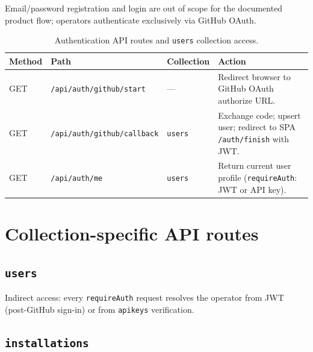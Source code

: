 Email/password registration and login are out of scope for the documented product flow; operators authenticate exclusively via GitHub OAuth.

\begin{table}[htbp]
  \centering
  \caption{Authentication API routes and \texttt{users} collection access.}
  \label{tab:auth-routes}
  \begin{tabular}{@{}lllp{}@{}}
    \toprule
    \textbf{Method} & \textbf{Path} & \textbf{Collection} & \textbf{Action} \\
    \midrule
    GET  & \texttt{/api/auth/github/start}    & ---     & Redirect browser to GitHub OAuth authorize URL. \\
    GET  & \texttt{/api/auth/github/callback} & \texttt{users} & Exchange code; upsert user; redirect to SPA \texttt{/auth/finish} with JWT. \\
    GET  & \texttt{/api/auth/me}              & \texttt{users} & Return current user profile (\texttt{requireAuth}: JWT or API key). \\
    \bottomrule
  \end{tabular}
\end{table}

\section{Collection-specific API routes}
\label{sec:collection-routes}

\subsection{\texttt{users}}
Indirect access: every \texttt{requireAuth} request resolves the operator from JWT (post-GitHub sign-in) or from \texttt{apikeys} verification.

\subsection{\texttt{installations}}

